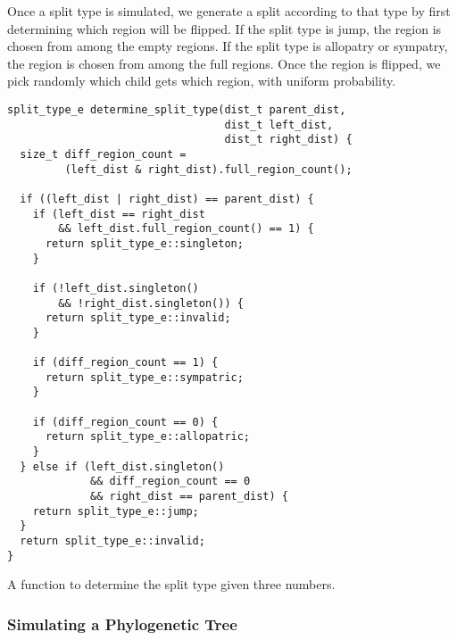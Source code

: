 \documentclass{article}
\begin{document}

Once a split type is simulated, we generate
a split according to that type by first determining which region will be
flipped\footnotemark.
If the split type is jump, the region is chosen from among the empty regions.
If the split type is allopatry or sympatry, the region is chosen from among the
full regions.
Once the region is flipped, we pick randomly which child gets which region,
with uniform probability.


\begin{listing}
	\begin{verbatim}
split_type_e determine_split_type(dist_t parent_dist, 
                                  dist_t left_dist, 
                                  dist_t right_dist) {
  size_t diff_region_count =
         (left_dist & right_dist).full_region_count();

  if ((left_dist | right_dist) == parent_dist) {
    if (left_dist == right_dist 
        && left_dist.full_region_count() == 1) {
      return split_type_e::singleton;
    }

    if (!left_dist.singleton() 
        && !right_dist.singleton()) {
      return split_type_e::invalid;
    }

    if (diff_region_count == 1) {
      return split_type_e::sympatric;
    }

    if (diff_region_count == 0) {
      return split_type_e::allopatric;
    }
  } else if (left_dist.singleton()
             && diff_region_count == 0
             && right_dist == parent_dist) {
    return split_type_e::jump;
  }
  return split_type_e::invalid;
}
\end{verbatim}
	\caption{A function to determine the split type given three numbers.}
	\label{lst:determine-split-type}
\end{listing}

\subsubsection{Simulating a Phylogenetic Tree}
\end{document}
